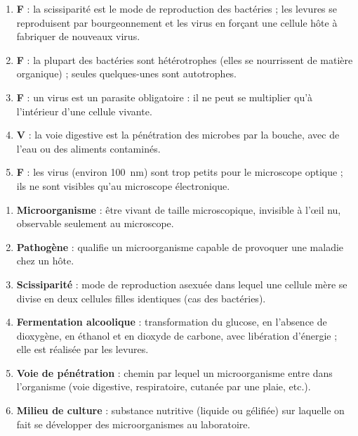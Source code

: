 \documentclass[11pt]{article}
\begin{document}
\begin{corrige}
\begin{enumerate}
\item \textbf{F} : la scissiparité est le mode de reproduction des bactéries ; les levures se reproduisent par bourgeonnement et les virus en forçant une cellule hôte à fabriquer de nouveaux virus.
\item \textbf{F} : la plupart des bactéries sont hétérotrophes (elles se nourrissent de matière organique) ; seules quelques-unes sont autotrophes.
\item \textbf{F} : un virus est un parasite obligatoire : il ne peut se multiplier qu'à l'intérieur d'une cellule vivante.
\item \textbf{V} : la voie digestive est la pénétration des microbes par la bouche, avec de l'eau ou des aliments contaminés.
\item \textbf{F} : les virus (environ \SI{100}{nm}) sont trop petits pour le microscope optique ; ils ne sont visibles qu'au microscope électronique.
\end{enumerate}
\end{corrige}

\begin{corrige}
\begin{enumerate}
\item \textbf{Microorganisme} : être vivant de taille microscopique, invisible à l'œil nu, observable seulement au microscope.
\item \textbf{Pathogène} : qualifie un microorganisme capable de provoquer une maladie chez un hôte.
\item \textbf{Scissiparité} : mode de reproduction asexuée dans lequel une cellule mère se divise en deux cellules filles identiques (cas des bactéries).
\item \textbf{Fermentation alcoolique} : transformation du glucose, en l'absence de dioxygène, en éthanol et en dioxyde de carbone, avec libération d'énergie ; elle est réalisée par les levures.
\item \textbf{Voie de pénétration} : chemin par lequel un microorganisme entre dans l'organisme (voie digestive, respiratoire, cutanée par une plaie, etc.).
\item \textbf{Milieu de culture} : substance nutritive (liquide ou gélifiée) sur laquelle on fait se développer des microorganismes au laboratoire.
\end{enumerate}
\end{corrige}
\end{document}

